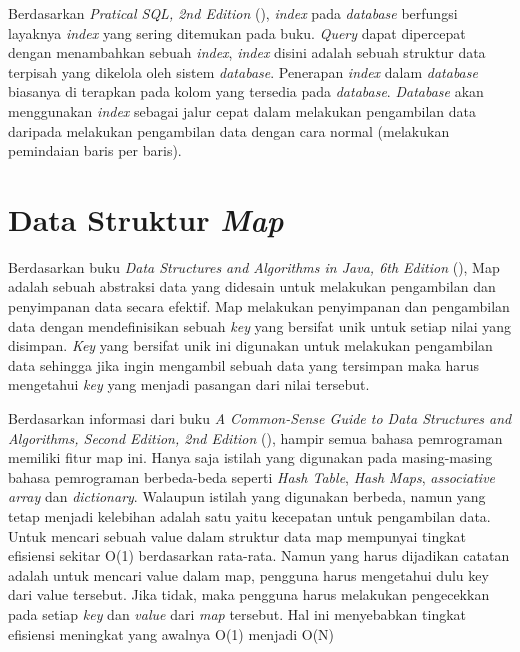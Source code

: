 Berdasarkan \emph{Pratical SQL, 2nd Edition} (\cite{praticalsql}), \emph{index} pada \emph{database}  berfungsi layaknya \emph{index} yang sering ditemukan pada buku. 
\emph{Query} dapat dipercepat dengan menambahkan sebuah \emph{index}, \emph{index} disini adalah sebuah struktur data terpisah yang dikelola
oleh sistem \emph{database}. Penerapan \emph{index} dalam \emph{database}  biasanya di terapkan pada kolom yang tersedia pada \emph{database}.
\emph{Database} akan menggunakan \emph{index} sebagai jalur cepat dalam melakukan pengambilan data daripada melakukan pengambilan data
dengan cara normal (melakukan pemindaian baris per baris).  

\section{Data Struktur \emph{Map}}

Berdasarkan buku \emph{Data Structures and Algorithms in Java, 6th Edition} (\cite{datastucturealgo}), Map adalah sebuah abstraksi data yang didesain untuk 
melakukan pengambilan dan penyimpanan data secara efektif. Map melakukan penyimpanan dan pengambilan data dengan mendefinisikan sebuah
\emph{key} yang bersifat unik untuk setiap nilai yang disimpan. \emph{Key} yang bersifat unik ini digunakan untuk melakukan pengambilan data
sehingga jika ingin mengambil sebuah data yang tersimpan maka harus mengetahui \emph{key} yang menjadi pasangan dari nilai tersebut.

Berdasarkan informasi dari buku \emph{A Common-Sense Guide to Data Structures and Algorithms, Second Edition, 2nd Edition} (\cite{commondatastucturealgo}), hampir semua bahasa
pemrograman memiliki fitur map ini. Hanya saja istilah yang digunakan pada masing-masing bahasa pemrograman berbeda-beda seperti \emph{Hash Table},
\emph{Hash Maps}, \emph{associative array} dan \emph{dictionary}. Walaupun istilah yang digunakan berbeda, namun yang tetap menjadi kelebihan adalah satu
yaitu kecepatan untuk pengambilan data. Untuk mencari sebuah value dalam struktur data map mempunyai tingkat efisiensi sekitar O(1) berdasarkan rata-rata.
Namun yang harus dijadikan catatan adalah untuk mencari value dalam map, pengguna harus mengetahui dulu key dari value tersebut. Jika tidak, maka pengguna harus
melakukan pengecekkan pada setiap \emph{key} dan \emph{value} dari \emph{map} tersebut. Hal ini menyebabkan tingkat efisiensi meningkat yang awalnya O(1) menjadi
O(N)

